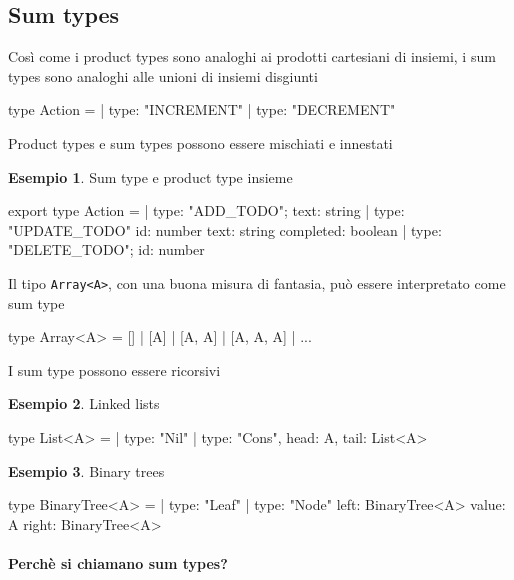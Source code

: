 \documentclass[12pt]{article}
\theoremstyle{definition}
\newtheorem{example}{Esempio}[subsection]
\newenvironment{code}
  {\vspace{0.5cm} \VerbatimEnvironment\begin{typescriptcode}}
  {\end{typescriptcode} \vspace{0.2cm}}
\begin{document}
\subsection{Sum types}

Così come i product types sono analoghi ai prodotti cartesiani di insiemi, i sum types sono analoghi alle unioni di insiemi disgiunti

\begin{code}
type Action =
  | { type: "INCREMENT" }
  | { type: "DECREMENT" }
\end{code}

Product types e sum types possono essere mischiati e innestati

\begin{example}
Sum type e product type insieme

\begin{code}
export type Action =
  | { type: "ADD_TODO"; text: string }
  | {
      type: "UPDATE_TODO"
      id: number
      text: string
      completed: boolean
    }
  | { type: "DELETE_TODO"; id: number }
\end{code}
\end{example}

Il tipo \texttt{Array<A>}, con una buona misura di fantasia, può essere interpretato come sum type

\begin{code}
type Array<A> = [] | [A] | [A, A] | [A, A, A] | ...
\end{code}

I sum type possono essere ricorsivi

\begin{example}
Linked lists

\begin{code}
type List<A> =
  | { type: "Nil" }
  | { type: "Cons", head: A, tail: List<A> }
\end{code}
\end{example}

\begin{example}
Binary trees

\begin{code}
type BinaryTree<A> =
  | { type: "Leaf" }
  | {
      type: "Node"
      left: BinaryTree<A>
      value: A
      right: BinaryTree<A>
    }
\end{code}
\end{example}

\paragraph{Perchè si chiamano sum types?}
\end{document}
